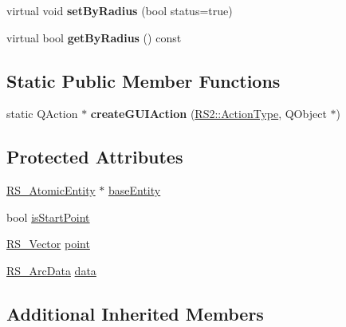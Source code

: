 \begin{DoxyCompactItemize}
\item 
\hypertarget{classRS__ActionDrawArcTangential_a0ea1722888d97fa1edc54ea9deebb7d1}{virtual void {\bfseries set\-By\-Radius} (bool status=true)}\label{classRS__ActionDrawArcTangential_a0ea1722888d97fa1edc54ea9deebb7d1}

\item 
\hypertarget{classRS__ActionDrawArcTangential_ae7ef178352aeddf83883379eee15af9c}{virtual bool {\bfseries get\-By\-Radius} () const }\label{classRS__ActionDrawArcTangential_ae7ef178352aeddf83883379eee15af9c}

\end{DoxyCompactItemize}
\subsection*{Static Public Member Functions}
\begin{DoxyCompactItemize}
\item 
\hypertarget{classRS__ActionDrawArcTangential_a33b088570c60c22d332b9a57b0e57449}{static Q\-Action $\ast$ {\bfseries create\-G\-U\-I\-Action} (\hyperlink{classRS2_afe3523e0bc41fd637b892321cfc4b9d7}{R\-S2\-::\-Action\-Type}, Q\-Object $\ast$)}\label{classRS__ActionDrawArcTangential_a33b088570c60c22d332b9a57b0e57449}

\end{DoxyCompactItemize}
\subsection*{Protected Attributes}
\begin{DoxyCompactItemize}
\item 
\hyperlink{classRS__AtomicEntity}{R\-S\-\_\-\-Atomic\-Entity} $\ast$ \hyperlink{classRS__ActionDrawArcTangential_a5b8b58b6b2d2eaacf4a123b2bb45ffb5}{base\-Entity}
\item 
bool \hyperlink{classRS__ActionDrawArcTangential_a6371a1230344ad660d4dadeb42d0d036}{is\-Start\-Point}
\item 
\hyperlink{classRS__Vector}{R\-S\-\_\-\-Vector} \hyperlink{classRS__ActionDrawArcTangential_ac969ed1f418242c6d46439d9d0a9a584}{point}
\item 
\hyperlink{classRS__ArcData}{R\-S\-\_\-\-Arc\-Data} \hyperlink{classRS__ActionDrawArcTangential_acd601829739530d471e4e4dec3f95465}{data}
\end{DoxyCompactItemize}
\subsection*{Additional Inherited Members}


